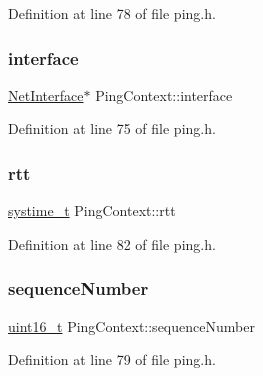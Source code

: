 Definition at line 78 of file ping.\+h.

\mbox{\label{structPingContext_a073a54777f8695b78d92e4dd1e65f50f}} 
\subsubsection{\texorpdfstring{interface}{interface}}
{\footnotesize\ttfamily \hyperlink{net_8h_a2234db8911a1148c9159979d8f5e0d6b}{Net\+Interface}$\ast$ Ping\+Context\+::interface}



Definition at line 75 of file ping.\+h.

\mbox{\label{structPingContext_a0849999bf979c232761d6cd831278822}} 
\subsubsection{\texorpdfstring{rtt}{rtt}}
{\footnotesize\ttfamily \hyperlink{compiler__port_8h_ae3e32a98d431a02106616da3071832dd}{systime\+\_\+t} Ping\+Context\+::rtt}



Definition at line 82 of file ping.\+h.

\mbox{\label{structPingContext_ab01b982ba9fd139a366a34a7ff3deda1}} 
\subsubsection{\texorpdfstring{sequence\+Number}{sequenceNumber}}
{\footnotesize\ttfamily \hyperlink{stdint_8h_a273cf69d639a59973b6019625df33e30}{uint16\+\_\+t} Ping\+Context\+::sequence\+Number}



Definition at line 79 of file ping.\+h.

\mbox{\label{structPingContext_a7350625b099ef9d224098259f713dc80}} 
